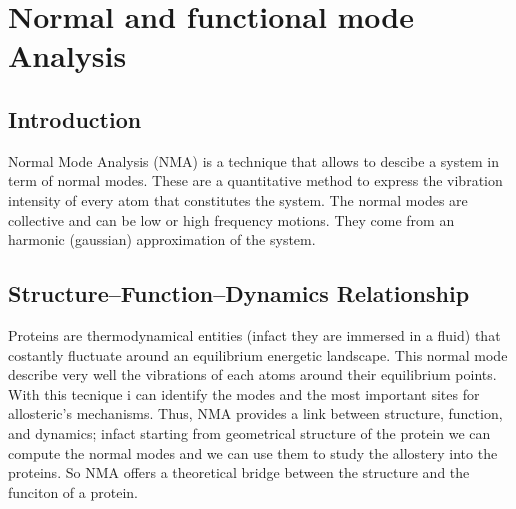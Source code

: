 \documentclass[English, Lau, oneside]{sapthesis}
\begin{document}







\newpage
\chapter{Normal and functional mode Analysis}
\section{Introduction}
\noindent 
Normal Mode Analysis (NMA) is a technique that allows to descibe a system in term of normal modes. These are a quantitative method to express the vibration intensity of every atom that constitutes the system.
The normal modes are collective and can be low or high frequency motions. They come from an harmonic (gaussian) approximation of the system.


\section{Structure--Function--Dynamics Relationship}
\noindent 
Proteins are thermodynamical entities (infact they are immersed in a fluid) that costantly fluctuate around an equilibrium energetic landscape.
This normal mode describe very well the vibrations of each atoms around their equilibrium points. With this tecnique i can identify the modes and the most important sites for allosteric's mechanisms.
Thus, NMA provides a link between structure, function, and dynamics;
infact starting from geometrical structure of the protein we can compute the normal modes and we can use them to study the allostery into the proteins.
So NMA offers a theoretical bridge between the structure and the funciton of a protein.
\end{document}
